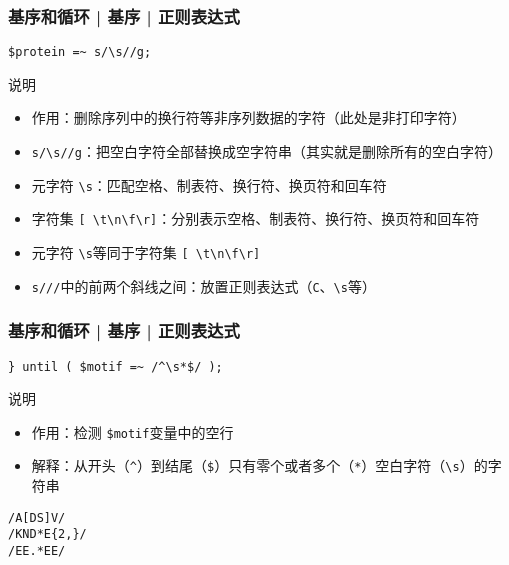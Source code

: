 \begin{frame}[fragile]
  \frametitle{基序和循环 | 基序 | \alert{正则表达式}}
\begin{lstlisting}
$protein =~ s/\s//g;
\end{lstlisting}
\pause
  \begin{block}{说明}
    \begin{itemize}
      \item 作用：删除序列中的换行符等非序列数据的字符（此处是非打印字符）
      \item \verb|s/\s//g|：把空白字符全部替换成空字符串（其实就是删除所有的空白字符）
      \item 元字符 \verb|\s|：匹配空格、制表符、换行符、换页符和回车符
      \item 字符集 \verb|[ \t\n\f\r]|：分别表示空格、制表符、换行符、换页符和回车符
      \item 元字符 \verb|\s|等同于字符集 \verb|[ \t\n\f\r]|
      \item \verb|s///|中的前两个斜线之间：放置正则表达式（\verb|C|、\verb|\s|等）
    \end{itemize}
  \end{block}
\end{frame}

\begin{frame}[fragile]
  \frametitle{基序和循环 | 基序 | \alert{正则表达式}}
\begin{lstlisting}
} until ( $motif =~ /^\s*$/ );
\end{lstlisting}
\pause
\begin{block}{说明}
  \begin{itemize}
    \item 作用：检测 \verb|$motif|变量中的空行
    \item 解释：从开头（\verb|^|）到结尾（\verb|$|）只有零个或者多个（\verb|*|）空白字符（\verb|\s|）的字符串
  \end{itemize}
\end{block}
\pause
\begin{lstlisting}
/A[DS]V/
/KND*E{2,}/
/EE.*EE/
\end{lstlisting}
\end{frame}

